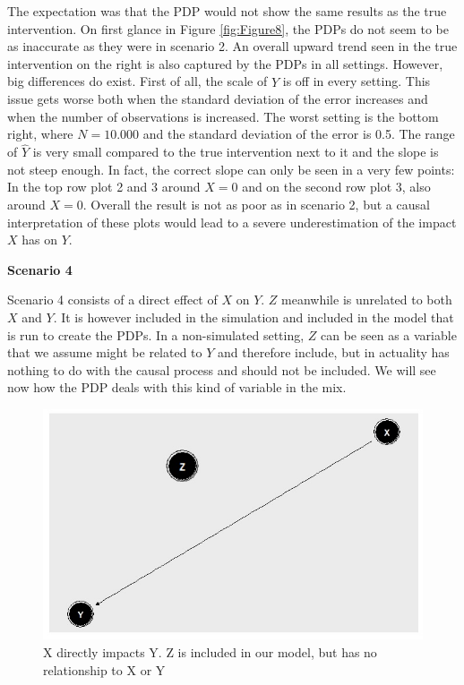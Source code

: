 \documentclass[]{krantz}
\begin{document}
The expectation was that the PDP would not show the same results as the
true intervention. On first glance in Figure \ref{fig:Figure8}, the PDPs
do not seem to be as inaccurate as they were in scenario 2. An overall
upward trend seen in the true intervention on the right is also captured
by the PDPs in all settings. However, big differences do exist. First of
all, the scale of \(\hat{Y}\) is off in every setting. This issue gets
worse both when the standard deviation of the error increases and when
the number of observations is increased. The worst setting is the bottom
right, where \(N = 10.000\) and the standard deviation of the error is
0.5. The range of \(\hat{Y}\) is very small compared to the true
intervention next to it and the slope is not steep enough. In fact, the
correct slope can only be seen in a very few points: In the top row plot
2 and 3 around \(X=0\) and on the second row plot 3, also around
\(X=0\). Overall the result is not as poor as in scenario 2, but a
causal interpretation of these plots would lead to a severe
underestimation of the impact \(X\) has on \(Y\).

\textbf{Scenario 4}

Scenario 4 consists of a direct effect of \(X\) on \(Y\). \(Z\)
meanwhile is unrelated to both \(X\) and \(Y\). It is however included
in the simulation and included in the model that is run to create the
PDPs. In a non-simulated setting, \(Z\) can be seen as a variable that
we assume might be related to \(Y\) and therefore include, but in
actuality has nothing to do with the causal process and should not be
included. We will see now how the PDP deals with this kind of variable
in the mix.

\begin{figure}

\includegraphics[width=1\linewidth]{images/scenario4} \hfill{}

\caption{X directly impacts Y. Z is included in our model, but has no relationship to X or Y}\label{fig:Figure9}
\end{figure}
\end{document}
